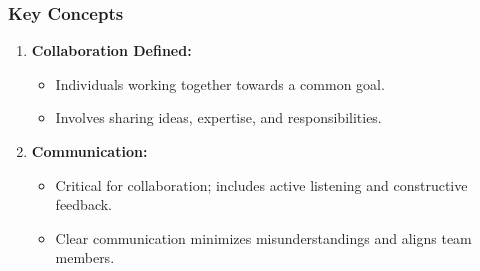 \documentclass[aspectratio=169]{beamer}
\begin{document}
\begin{frame}[fragile]
    \frametitle{Key Concepts}
    \begin{enumerate}
        \item \textbf{Collaboration Defined:}
        \begin{itemize}
            \item Individuals working together towards a common goal.
            \item Involves sharing ideas, expertise, and responsibilities.
        \end{itemize}
        
        \item \textbf{Communication:}
        \begin{itemize}
            \item Critical for collaboration; includes active listening and constructive feedback.
            \item Clear communication minimizes misunderstandings and aligns team members.
        \end{itemize}
    \end{enumerate}
\end{frame}
\end{document}

